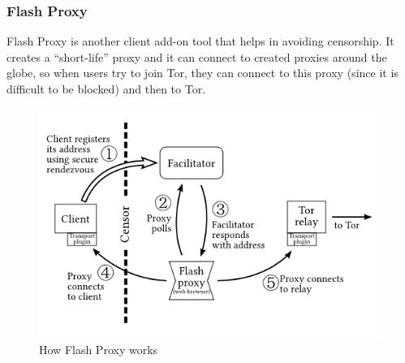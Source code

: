 \subsubsection{Flash Proxy}
Flash Proxy \cite{FlashProxy} is another client add-on tool that helps in avoiding censorship. It creates a “short-life” proxy and it can connect to created proxies around the globe, so when users try to join Tor, they can connect to this proxy (since it is difficult to be blocked) and then to Tor.

\begin{figure}[!h]
 \includegraphics[width=16cm]{flashProxy}
 \caption{How Flash Proxy works}
\end{figure}